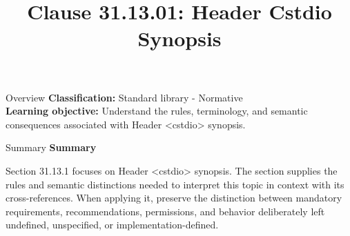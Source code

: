 \documentclass[10pt,letterpaper]{article}
\title{Clause 31.13.01: Header Cstdio Synopsis}
\author{}
\date{}
\begin{document}
\maketitle
\begin{CornellOverviewBox}{Overview}
\textbf{Classification:} Standard library - Normative\\[2pt]
\textbf{Learning objective:} Understand the rules, terminology, and semantic consequences associated with Header <cstdio> synopsis.
\end{CornellOverviewBox}\begin{CornellSummaryBox}{Summary}
{\sffamily\bfseries\color{Accent} Summary}\par\vspace{3pt}Section 31.13.1 focuses on Header <cstdio> synopsis. The section supplies the rules and semantic distinctions needed to interpret this topic in context with its cross-references. When applying it, preserve the distinction between mandatory requirements, recommendations, permissions, and behavior deliberately left undefined, unspecified, or implementation-defined.
\end{CornellSummaryBox}
\end{document}
